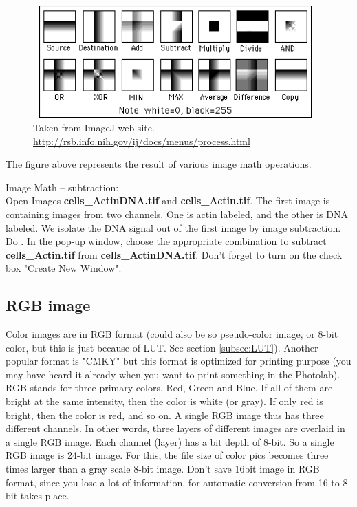 \begin{figure}[h!]
\begin{center}
\includegraphics[width=10.945cm,height=4.323cm]{fig/CMCIBasicCourse201102-img13.png}
\caption{Taken from ImageJ web site. \url{http://rsb.info.nih.gov/ij/docs/menus/process.html}}
\label{fig:img13}
\end{center}
\end{figure}

The figure above represents the result of various image math operations. 

\begin{indentexercise}{1}
Image Math -- subtraction:\\
Open Images \textbf{cells\_ActinDNA.tif} and \textbf{cells\_Actin.tif}.
The first image is containing images from two channels. One is actin
labeled, and the other is DNA labeled. We isolate the DNA signal out of
the first image by image subtraction. Do . In the pop-up window, choose the appropriate combination to subtract \textbf{cells\_Actin.tif} from \textbf{cells\_ActinDNA.tif}. Don't forget to turn on the check box "Create New Window". 
\end{indentexercise}


\subsection{RGB image}

Color images are in RGB format (could also be so pseudo-color image, or
8-bit color, but this is just because of LUT. See section \ref{subsec:LUT}).
Another popular format is "CMKY" but this
format is optimized for printing purpose (you may have heard it already
when you want to print something in the Photolab). RGB stands for three
primary colors. Red, Green and Blue. If all of them are bright at the
same intensity, then the color is white (or gray). If only red is
bright, then the color is red, and so on. A single RGB image thus has
three different channels. In other words, three layers of different
images are overlaid in a single RGB image. Each channel (layer) has a
bit depth of 8-bit. So a single RGB image is 24-bit image. For this,
the file size of color pics becomes three times larger than a gray scale
8-bit image. Don't save 16bit image in RGB format,
since you lose a lot of information, for automatic conversion from 16
to 8 bit takes place. 

